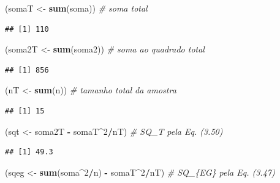 \documentclass[
]{book}
\newenvironment{Shaded}{\begin{snugshade}}{\end{snugshade}}
\newcommand{\CommentTok}[1]{\textcolor[rgb]{0.56,0.35,0.01}{\textit{#1}}}
\newcommand{\DecValTok}[1]{\textcolor[rgb]{0.00,0.00,0.81}{#1}}
\newcommand{\KeywordTok}[1]{\textcolor[rgb]{0.13,0.29,0.53}{\textbf{#1}}}
\newcommand{\NormalTok}[1]{#1}
\newcommand{\OperatorTok}[1]{\textcolor[rgb]{0.81,0.36,0.00}{\textbf{#1}}}
\newcommand{\StringTok}[1]{\textcolor[rgb]{0.31,0.60,0.02}{#1}}
\theoremstyle{definition}
\theoremstyle{definition}
\theoremstyle{definition}
\theoremstyle{remark}
\begin{document}
\begin{Shaded}
\begin{Highlighting}[]
\NormalTok{(somaT \textless{}{-}}\StringTok{ }\KeywordTok{sum}\NormalTok{(soma))      }\CommentTok{\# soma total}
\end{Highlighting}
\end{Shaded}

\begin{verbatim}
## [1] 110
\end{verbatim}

\begin{Shaded}
\begin{Highlighting}[]
\NormalTok{(soma2T \textless{}{-}}\StringTok{ }\KeywordTok{sum}\NormalTok{(soma2))    }\CommentTok{\# soma ao quadrado total}
\end{Highlighting}
\end{Shaded}

\begin{verbatim}
## [1] 856
\end{verbatim}

\begin{Shaded}
\begin{Highlighting}[]
\NormalTok{(nT \textless{}{-}}\StringTok{ }\KeywordTok{sum}\NormalTok{(n))            }\CommentTok{\# tamanho total da amostra}
\end{Highlighting}
\end{Shaded}

\begin{verbatim}
## [1] 15
\end{verbatim}

\begin{Shaded}
\begin{Highlighting}[]
\NormalTok{(sqt \textless{}{-}}\StringTok{ }\NormalTok{soma2T }\OperatorTok{{-}}\StringTok{ }\NormalTok{somaT}\OperatorTok{\^{}}\DecValTok{2}\OperatorTok{/}\NormalTok{nT) }\CommentTok{\# SQ\_T pela Eq. (3.50)}
\end{Highlighting}
\end{Shaded}

\begin{verbatim}
## [1] 49.3
\end{verbatim}

\begin{Shaded}
\begin{Highlighting}[]
\NormalTok{(sqeg \textless{}{-}}\StringTok{ }\KeywordTok{sum}\NormalTok{(soma}\OperatorTok{\^{}}\DecValTok{2}\OperatorTok{/}\NormalTok{n) }\OperatorTok{{-}}\StringTok{ }\NormalTok{somaT}\OperatorTok{\^{}}\DecValTok{2}\OperatorTok{/}\NormalTok{nT) }\CommentTok{\# SQ\_\{EG\} pela Eq. (3.47)}
\end{Highlighting}
\end{Shaded}
\end{document}
